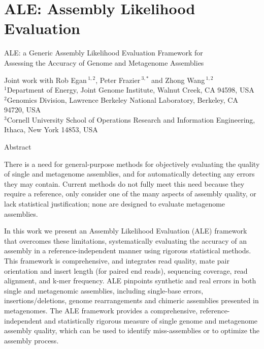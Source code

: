 \documentclass[phd,tocprelim]{cornell}
\begin{document}
\part{ALE: Assembly Likelihood Evaluation} %
\label{prt:ALE: Assembly Likelihood Evaluation}
\singlespacing

\noindent
\large
ALE: a Generic Assembly Likelihood Evaluation Framework for \\ Assessing the Accuracy of Genome and Metagenome Assemblies

\noindent
\normalsize
Joint work with Rob Egan\,$^{1,2}$, Peter Frazier\,$^{3,*}$ and Zhong Wang\,$^{1,2}$ \\
\scriptsize
$^{1}$Department of Energy, Joint Genome Institute, Walnut Creek, CA 94598, USA\\
$^{2}$Genomics Division, Lawrence Berkeley National Laboratory, Berkeley, CA 94720, USA\\
$^{3}$Cornell University School of Operations Research and Information Engineering, Ithaca, New York 14853, USA
\normalsize

\normalspacing

\begin{center}
   Abstract 
\end{center}

There is a need for general-purpose methods for objectively evaluating the quality of single and metagenome assemblies, and for automatically detecting any errors they may contain.  Current methods do not fully meet this need because they require a reference, only consider one of the many aspects of assembly quality, or lack statistical justification; none are designed to evaluate metagenome assemblies.

In this work we present an Assembly Likelihood Evaluation (ALE) framework that overcomes these limitations, systematically evaluating the accuracy of an assembly in a reference-independent manner using rigorous statistical methods.  This framework is comprehensive, and integrates read quality, mate pair orientation and insert length (for paired end reads), sequencing coverage, read alignment, and k-mer frequency. ALE pinpoints synthetic and real errors in both single and metagenomic assemblies, including single-base errors, insertions/deletions, genome rearrangements and chimeric assemblies presented in metagenomes.  The ALE framework provides a comprehensive, reference-independent and statistically rigorous measure of single genome and metagenome assembly quality, which can be used to identify miss-assemblies or to optimize the assembly process.
\end{document}
